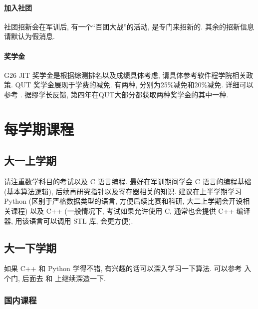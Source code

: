 \documentclass{jit-qut}
\begin{document}
\paragraph{加入社团} 社团招新会在军训后, 有一个``百团大战''的活动, 是专门来招新的. 其余的招新信息请默认为假消息.

\paragraph{奖学金} G26 JIT 奖学金是根据综测排名以及成绩具体考虑, 请具体参考软件程学院相关政策. QUT 奖学金展现于学费的减免. 有两种, 分别为25\%减免和20\%减免. 详细可以参考 . 据缪学长反馈, 第四年在QUT大部分都获取两种奖学金的其中一种. 


\newpage

\section{每学期课程}
\subsection{大一上学期}
请注重数学科目的考试以及 C 语言编程. 最好在军训期间学会 C 语言的编程基础 (基本算法逻辑), 后续再研究指针以及寄存器相关的知识. 建议在上半学期学习 Python (区别于严格数据类型的语言, 方便后续比赛和科研, 大二上学期会开设相关课程) 以及 C++ (一般情况下, 考试如果允许使用 C, 通常也会提供 C++ 编译器, 用该语言可以调用 STL 库, 会更方便). 


\subsection{大一下学期}
如果 C++ 和 Python 学得不错, 有兴趣的话可以深入学习一下算法. 可以参考  入个门, 后面去  和  上继续深造一下. 
\subsubsection{国内课程}
\end{document}
